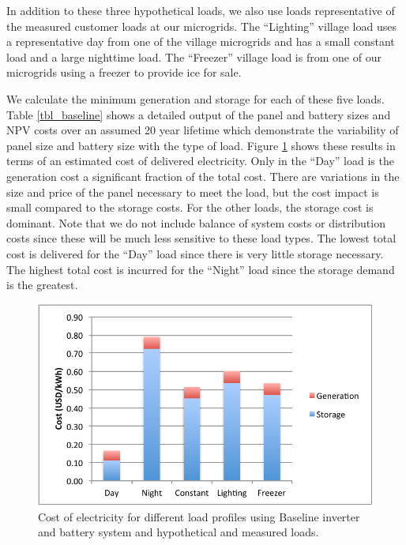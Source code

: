 \documentclass[conference]{IEEEtran}
\begin{document}
In addition to these three hypothetical loads, we also use loads
representative of the measured customer loads at our microgrids.
The ``Lighting'' village load uses a representative day from one of the
village microgrids and has a small constant load and a large
nighttime load.
The ``Freezer'' village load is from one of our microgrids using a freezer
to provide ice for sale.

We calculate the minimum generation and storage for each
of these five loads.
Table \ref{tbl_baseline} shows a detailed output of the panel and
battery sizes and NPV costs over an assumed 20 year lifetime
which demonstrate the variability of panel size and battery
size with the type of load.
Figure \ref{fig_baseline}
shows these results in terms of an estimated cost of delivered
electricity.
Only in the ``Day'' load is the generation cost a significant
fraction of the total cost.
There are variations in the size and price of the panel
necessary to meet the load, but the cost impact is small
compared to the storage costs.
For the other loads, the storage cost is dominant.
Note that we do not include balance of system costs or
distribution costs since these will be much less sensitive
to these load types.
The lowest total cost is delivered for the ``Day'' load
since there is very little storage necessary.
The highest total cost is incurred for the ``Night'' load since
the storage demand is the greatest.


\begin{figure}[]
\begin{center}
\includegraphics[width=\columnwidth]{figures/baseline.pdf}
\end{center}
\caption{Cost of electricity for different load profiles using Baseline
inverter and battery system and hypothetical and measured loads.}
\label{fig_baseline}
\end{figure}
\end{document}
